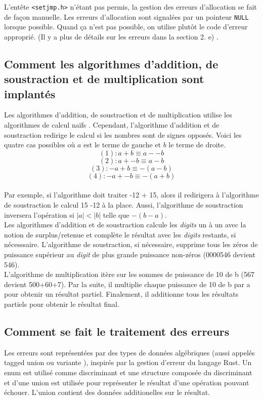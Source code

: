 \documentclass[a4paper,12pt,french]{article}
\begin{document}
		L'entête \lstinline$<setjmp.h>$ n'étant pas permis, la gestion des erreurs d'allocation se fait de
		façon manuelle. Les erreurs d'allocation sont signalées par un pointeur \lstinline$NULL$ lorsque
		possible. Quand ça n'est pas possible, on utilise plutôt le code d'erreur approprié.
		(Il y a plus de détails sur les erreurs dans la section 2. e) .\\
		\subsection{Comment les algorithmes d’addition, de soustraction et de multiplication sont implantés}
		Les algorithmes d'addition, de soustraction et de multiplication utilise les algorithmes de calcul \og naïfs \fg{}. Cependant, l'algorithme d'addition et de soustraction redirige le calcul si les nombres sont de signes opposés. Voici les quatre cas possibles où $a$ est le terme de gauche et $b$ le terme de droite.
		\[ (1) : a + b \equiv a - -b\]
		\[ (2) : a + -b \equiv a - b  \]
		\[ (3) : -a + b \equiv -(a-b) \]
		\[ (4) : -a + -b \equiv -(a+b) \]
		\\Par exemple, si l'algorithme doit traiter -12 + 15, alors il redirigera à l'algorithme de soustraction le calcul 15 -12 à la place. Aussi, l'algorithme de soustraction inversera l'opération si $|a| < |b|$ telle que $-(b-a)$.\\
		
		Les algorithmes d'addition et de soustraction calcule les \textit{digits} un à un avec la notion de surplus/retenue et complète le résultat avec les \textit{digits} restants, si nécesssaire. L'algorithme de soustraction, si nécessaire, supprime tous les zéros de puissance supérieur au \textit{digit} de plus grande puissance non-zéros (0000546 devient 546).\\
		
		L'algorithme de multiplication itère sur les sommes de puissance de 10 de b (567 devient 500+60+7). Par la suite, il multiplie chaque puissance de 10 de b par a pour obtenir un résultat partiel. Finalement, il additionne tous les résultats partiels pour obtenir le résultat final.
		\subsection{Comment se fait le traitement des erreurs}
		Les erreurs sont représentées par des types de données algébriques (aussi appelés  \og tagged union \fg{}
		ou \og variante \fg{}), inspirés par la gestion d'erreur du langage Rust. Un enum est utilisé comme
		discriminant et une structure composée du discriminant et d'une union est utilisée pour représenter
		le résultat d'une opération pouvant échouer. L'union contient des données additionelles sur le
		résultat.\\
		
\end{document}
